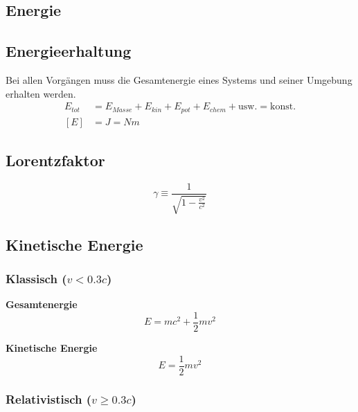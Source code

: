\documentclass[7pt]{article}
\begin{document}
\begin{multicols*}{3}

\section{Energie}

\subsection{Energieerhaltung}

Bei allen Vorg{\"a}ngen muss die Gesamtenergie eines Systems und seiner Umgebung erhalten werden.
\begin{equation*}
\begin{split}
	E_{tot} & = E_{Masse} + E_{kin} + E_{pot} + E_{chem} + \text{usw.} = \text{konst.} \\
	[E] & = J = Nm
\end{split}
\end{equation*}

\subsection{Lorentzfaktor}

\begin{equation*}
	\gamma \equiv \frac{1}{\sqrt{1-\frac{v^2}{c^2}}}
\end{equation*}

\subsection{Kinetische Energie}

\subsubsection{Klassisch ($v < 0.3c$)}

\textbf{Gesamtenergie}
\begin{equation*}
	E = mc^2 + \frac{1}{2}mv^2
\end{equation*}

\textbf{Kinetische Energie}
\begin{equation*}
	E = \frac{1}{2}mv^2
\end{equation*}

\subsubsection{Relativistisch ($v \geq 0.3c$)}


\end{multicols*}
\end{document}
